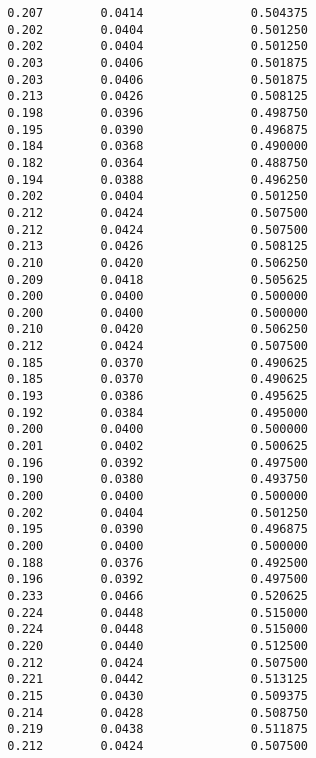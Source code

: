 \documentclass[
  letterpaper,
  DIV=11,
  numbers=noendperiod]{scrartcl}
\begin{document}
\begin{verbatim}
  0.207        0.0414               0.504375              
  0.202        0.0404               0.501250              
  0.202        0.0404               0.501250              
  0.203        0.0406               0.501875              
  0.203        0.0406               0.501875              
  0.213        0.0426               0.508125              
  0.198        0.0396               0.498750              
  0.195        0.0390               0.496875              
  0.184        0.0368               0.490000              
  0.182        0.0364               0.488750              
  0.194        0.0388               0.496250              
  0.202        0.0404               0.501250              
  0.212        0.0424               0.507500              
  0.212        0.0424               0.507500              
  0.213        0.0426               0.508125              
  0.210        0.0420               0.506250              
  0.209        0.0418               0.505625              
  0.200        0.0400               0.500000              
  0.200        0.0400               0.500000              
  0.210        0.0420               0.506250              
  0.212        0.0424               0.507500              
  0.185        0.0370               0.490625              
  0.185        0.0370               0.490625              
  0.193        0.0386               0.495625              
  0.192        0.0384               0.495000              
  0.200        0.0400               0.500000              
  0.201        0.0402               0.500625              
  0.196        0.0392               0.497500              
  0.190        0.0380               0.493750              
  0.200        0.0400               0.500000              
  0.202        0.0404               0.501250              
  0.195        0.0390               0.496875              
  0.200        0.0400               0.500000              
  0.188        0.0376               0.492500              
  0.196        0.0392               0.497500              
  0.233        0.0466               0.520625              
  0.224        0.0448               0.515000              
  0.224        0.0448               0.515000              
  0.220        0.0440               0.512500              
  0.212        0.0424               0.507500              
  0.221        0.0442               0.513125              
  0.215        0.0430               0.509375              
  0.214        0.0428               0.508750              
  0.219        0.0438               0.511875              
  0.212        0.0424               0.507500              

\end{verbatim}
\end{document}

